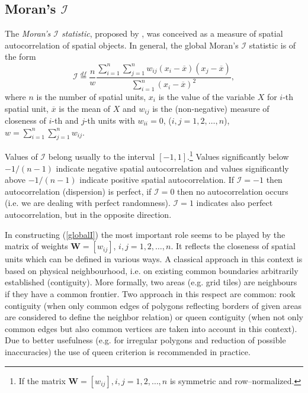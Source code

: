 \subsection{Moran's $\mathcal{I}$} \label{sec:util_moran}

The \emph{Moran's $\mathcal{I}$ statistic}, proposed by \cite{Moran1950}, was conceived as a measure of spatial autocorrelation of spatial objects. In general, the global Moran's $\mathcal{I}$ statistic is of the form
\begin{equation}
    \mathcal{I}\stackrel{df}{=}\frac{n}{w}\frac{\sum_{i=1}^n{\sum_{j=1}^n{w_{ij}(x_i-\overline{x})(x_j-\overline{x})}}}{\sum_{i=1}^n{(x_i-\overline{x})^2}},
\label{globalI}
\end{equation}
where $n$ is the number of spatial units, $x_i$ is the value of the variable $X$ for $i$-th spatial unit, $\overline{x}$ is the mean of $X$ and $w_{ij}$ is the (non-negative) measure of closeness of $i$-th and $j$-th units with $w_{ii}=0$, ($i,j=1,2,\ldots,n$), $w=\sum_{i=1}^n{\sum_{j=1}^n{w_{ij}}}$.

Values of $\mathcal{I}$ belong usually to the interval $[-1,1]$.\footnote{If the matrix $\mathbf{W}=[w_{ij}],i,j=1,2,\ldots,n$ is symmetric and row--normalized.} Values significantly below $-1/(n-1)$ indicate negative spatial autocorrelation and values significantly above $-1/(n-1)$ indicate positive spatial autocorrelation. If $\mathcal{I}=-1$ then autocorrelation (dispersion) is perfect, if $\mathcal{I}=0$ then no autocorrelation occurs (i.e. we are dealing with perfect randomness). $\mathcal{I}=1$ indicates also perfect autocorrelation, but in the opposite direction.

In constructing (\ref{globalI}) the most important role seems to be played by the matrix of weights $\mathbf{W}=[w_{ij}]$, $i,j=1,2,\ldots,n$. It reflects the closeness of spatial units which can be defined in various ways. A classical approach in this context is based on physical neighbourhood, i.e. on existing common boundaries arbitrarily established (contiguity). More formally, two areas (e.g. grid tiles) are neighbours if they have a common frontier. Two approach in this respect are common: rook contiguity (when only common edges of polygons reflecting borders of given areas are considered to define the neighbor relation) or queen contiguity (when not only common edges but also common vertices are taken into account in this context). Due to better usefulness (e.g. for irregular polygons and reduction of possible inaccuracies) the use of queen criterion is recommended in practice. 

